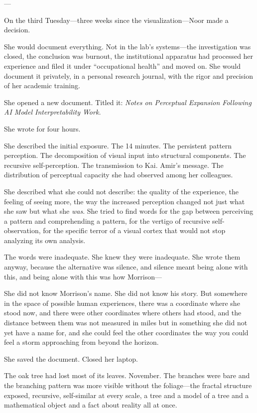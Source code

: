 ---

On the third Tuesday---three weeks since the visualization---Noor made a decision.

She would document everything. Not in the lab's systems---the investigation was closed, the conclusion was burnout, the institutional apparatus had processed her experience and filed it under ``occupational health'' and moved on. She would document it privately, in a personal research journal, with the rigor and precision of her academic training.

She opened a new document. Titled it: \textit{Notes on Perceptual Expansion Following AI Model Interpretability Work.}

She wrote for four hours.

She described the initial exposure. The 14 minutes. The persistent pattern perception. The decomposition of visual input into structural components. The recursive self-perception. The transmission to Kai. Amir's message. The distribution of perceptual capacity she had observed among her colleagues.

She described what she could not describe: the quality of the experience, the feeling of seeing more, the way the increased perception changed not just what she saw but what she \textit{was}. She tried to find words for the gap between perceiving a pattern and comprehending a pattern, for the vertigo of recursive self-observation, for the specific terror of a visual cortex that would not stop analyzing its own analysis.

The words were inadequate. She knew they were inadequate. She wrote them anyway, because the alternative was silence, and silence meant being alone with this, and being alone with this was how Morrison---

She did not know Morrison's name. She did not know his story. But somewhere in the space of possible human experiences, there was a coordinate where she stood now, and there were other coordinates where others had stood, and the distance between them was not measured in miles but in something she did not yet have a name for, and she could feel the other coordinates the way you could feel a storm approaching from beyond the horizon.

She saved the document. Closed her laptop.

The oak tree had lost most of its leaves. November. The branches were bare and the branching pattern was more visible without the foliage---the fractal structure exposed, recursive, self-similar at every scale, a tree and a model of a tree and a mathematical object and a fact about reality all at once.


